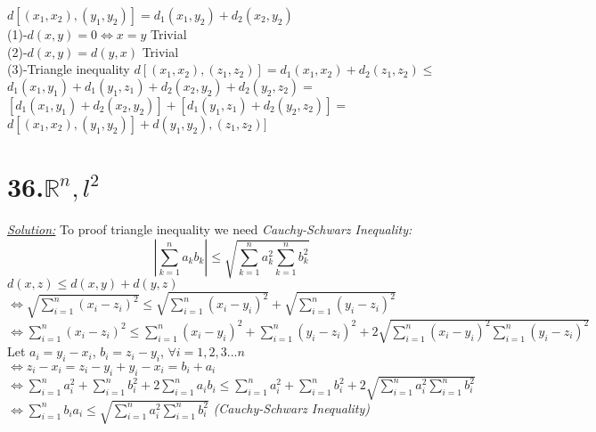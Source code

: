 \documentclass{book}
\begin{document}
\begin{tcolorbox}[enhanced,attach boxed title to top center={yshift=-3mm,yshifttext=-1mm},
colback=blue!5!white,colframe=blue!75!black,colbacktitle=red!80!black,
title={Exercise 35.8:},fonttitle=\bfseries,
boxed title style={size=small,colframe=red!50!black} ]
$d[(x_1,x_2),(y_1,y_2)]=d_1(x_1,y_2)+d_2(x_2,y_2)$\\
(1)-$d(x,y)=0\iff x=y$ Trivial\\
(2)-$d(x,y)=d(y,x)$ Trivial\\
(3)-Triangle inequality $d[(x_1,x_2),(z_1,z_2)]=d_1(x_1,x_2)+d_2(z_1,z_2)\leq$\\ 
$d_1(x_1,y_1)+d_1(y_1,z_1)+d_2(x_2,y_2)+d_2(y_2,z_2)=$\\
$[d_1(x_1,y_1)+d_2(x_2,y_2)]+[d_1(y_1,z_1)+d_2(y_2,z_2)]=$\\ 
$d[(x_1,x_2),(y_1,y_2)]+d(y_1,y_2),(z_1,z_2)]$
\end{tcolorbox}
\section{36.$\mathbb{R}^n, l^2$}

\begin{tcolorbox}[enhanced,attach boxed title to top center={yshift=-3mm,yshifttext=-1mm},
colback=blue!5!white,colframe=blue!75!black,colbacktitle=red!80!black,
title= {$(\mathbb{R}^n,d)$ is a metric space, $d=\sqrt{\sum_{i=1}^{n}(x_i-y_i)^2}:$:},fonttitle=\bfseries,
boxed title style={size=small,colframe=red!50!black} ]
\textit{\color{blue}\underline{Solution:}}
To proof triangle inequality we need \textit{\color{blue}Cauchy-Schwarz	Inequality:}\\
{$$\left |\sum_{k=1}^{n}a_k b_k \right |\leq \sqrt{\sum_{k=1}^{n}a_k^2 \sum_{k=1}^{n}b_k^2}$$}
$d(x,z)\leq d(x,y)+d(y,z)$\\
$\Leftrightarrow \sqrt{\sum_{i=1}^{n}(x_i-z_i)^2}\leq 
\sqrt{\sum_{i=1}^{n}(x_i-y_i)^2}+\sqrt{\sum_{i=1}^{n}(y_i-z_i)^2}$\\
$\Leftrightarrow \sum_{i=1}^{n}(x_i-z_i)^2\leq 
\sum_{i=1}^{n}(x_i-y_i)^2+\sum_{i=1}^{n}(y_i-z_i)^2+2\sqrt{\sum_{i=1}^{n}(x_i-y_i)^2\sum_{i=1}^{n}(y_i-z_i)^2}$\\
Let $a_i=y_i-x_i$,  $b_i=z_i-y_i$, $\forall i=1,2,3...n$\\
$\Leftrightarrow z_i-x_i=z_i-y_i+y_i-x_i=b_i+a_i$\\
$\Leftrightarrow \sum_{i=1}^{n}a_i^2+ \sum_{i=1}^{n}b_i^2+2\sum_{i=1}^{n}a_i b_i\leq 
\sum_{i=1}^{n}a_i^2+\sum_{i=1}^{n}b_i^2+2\sqrt{\sum_{i=1}^{n}a_i^2\sum_{i=1}^{n} b_i^2}$
$\Leftrightarrow \sum_{i=1}^{n}b_i a_i\leq \sqrt{\sum_{i=1}^{n}a_i^2\sum_{i=1}^{n} b_i^2}$ 
\textit{\color{blue}(Cauchy-Schwarz Inequality)}
\end{tcolorbox}
\end{document}
